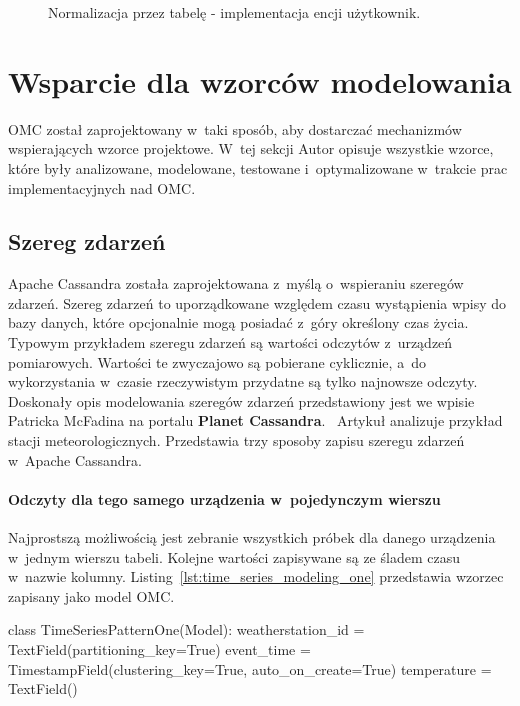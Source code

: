 \begin{figure}[ht!]
	\centering
	\theverbbox
	\caption{Normalizacja przez tabelę - implementacja encji użytkownik.}
	\label{lst:normalization_by_table_example}
\end{figure}

\section{Wsparcie dla wzorców modelowania}

OMC został zaprojektowany w~taki sposób, aby dostarczać mechanizmów wspierających wzorce projektowe. W~tej sekcji Autor opisuje wszystkie wzorce, które były analizowane, modelowane, testowane i~optymalizowane w~trakcie prac implementacyjnych nad OMC.

\subsection{Szereg zdarzeń}

Apache Cassandra została zaprojektowana z~myślą o~wspieraniu szeregów zdarzeń. Szereg zdarzeń to uporządkowane względem czasu wystąpienia wpisy do bazy danych, które opcjonalnie mogą posiadać z~góry określony czas życia. Typowym przykładem szeregu zdarzeń są wartości odczytów z~urządzeń pomiarowych. Wartości te zwyczajowo są pobierane cyklicznie, a~do wykorzystania w~czasie rzeczywistym przydatne są tylko najnowsze odczyty. Doskonały opis modelowania szeregów zdarzeń przedstawiony jest we wpisie Patricka McFadina na portalu \textbf{Planet Cassandra}.~\cite{time_series_modeling_pattern} Artykuł analizuje przykład stacji meteorologicznych. Przedstawia trzy sposoby zapisu szeregu zdarzeń w~Apache Cassandra. 

\paragraph{Odczyty dla tego samego urządzenia w~pojedynczym wierszu} 

Najprostszą możliwością jest zebranie wszystkich próbek dla danego urządzenia w~jednym wierszu tabeli. Kolejne wartości zapisywane są ze śladem czasu w~nazwie kolumny. Listing~\ref{lst:time_series_modeling_one} przedstawia wzorzec zapisany jako model OMC.

\begin{verbbox}
class TimeSeriesPatternOne(Model):
    weatherstation_id = TextField(partitioning_key=True)
    event_time = TimestampField(clustering_key=True, auto_on_create=True)
    temperature = TextField()
\end{verbbox}

